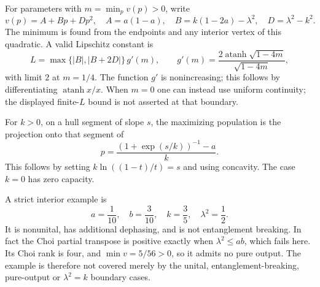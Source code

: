 \documentclass[11pt]{article}
\begin{document}
For parameters with $m=\min_p v(p)>0$, write
\[
 v(p)=A+Bp+Dp^2,\quad
 A=a(1-a),\quad B=k(1-2a)-\lambda^2,\quad D=\lambda^2-k^2.
\]
The minimum is found from the endpoints and any interior vertex of this quadratic. A valid Lipschitz constant is
\[
 L=\max\{|B|,|B+2D|\}\,g'(m),\qquad
 g'(m)=\frac{2\operatorname{atanh}\sqrt{1-4m}}{\sqrt{1-4m}},
\]
with limit $2$ at $m=1/4$. The function $g'$ is nonincreasing; this follows by differentiating $\operatorname{atanh}x/x$. When $m=0$ one can instead use uniform continuity; the displayed finite-$L$ bound is not asserted at that boundary.

For $k>0$, on a hull segment of slope $s$, the maximizing population is the projection onto that segment of
\[
 p=\frac{(1+\exp(s/k))^{-1}-a}{k}.
\]
This follows by setting $k\ln((1-t)/t)=s$ and using concavity. The case $k=0$ has zero capacity.

A strict interior example is
\[
 a=\frac1{10},\quad b=\frac3{10},\quad k=\frac35,\quad
 \lambda^2=\frac12.
\]
It is nonunital, has additional dephasing, and is not entanglement breaking. In fact the Choi partial transpose is positive exactly when $\lambda^2\le ab$, which fails here. Its Choi rank is four, and $\min v=5/56>0$, so it admits no pure output. The example is therefore not covered merely by the unital, entanglement-breaking, pure-output or $\lambda^2=k$ boundary cases.
\end{document}
